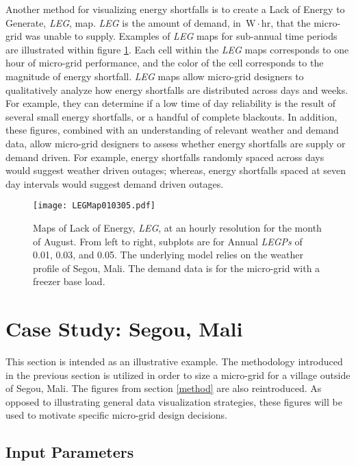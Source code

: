 \documentclass{article}
\newcommand{\unit}[1]{\ensuremath{\, \mathrm{#1}}}
\begin{document}
Another method for visualizing energy shortfalls is to create a Lack of Energy to Generate, \emph{LEG}, map. 
\emph{LEG} is the amount of demand, in \unit{W\! \cdot \! hr}, that the micro-grid was unable to supply.
Examples of \emph{LEG} maps for sub-annual time periods are illustrated within figure \ref{LEGMaps}.
Each cell within the \emph{LEG} maps corresponds to one hour of micro-grid performance, and the color of the cell corresponds to the magnitude of energy shortfall. 
\emph{LEG} maps allow micro-grid designers to qualitatively analyze how energy shortfalls are distributed across days and weeks.
For example, they can determine if a low time of day reliability is the result of several small energy shortfalls, or a handful of complete blackouts. 
In addition, these figures, combined with an understanding of relevant weather and demand data, allow micro-grid designers to assess whether energy shortfalls are supply or demand driven. 
For example, energy shortfalls randomly spaced across days would suggest weather driven outages; whereas, energy shortfalls spaced at seven day intervals would suggest demand driven outages. 


\begin{figure}[ht] 
  \centering
    \texttt{[image: LEGMap010305.pdf]}
  \caption{Maps of Lack of Energy, \emph{LEG}, at an hourly resolution for the month of August.
   From left to right, subplots are for Annual \emph{LEGPs} of 0.01, 0.03, and 0.05. 
  The underlying model relies on the weather profile of Segou, Mali.
  The demand data is for the micro-grid with a freezer base load.}
\label{LEGMaps}
\end{figure}

\section{Case Study: Segou, Mali} \label{CaseStudy}


This section is intended as an illustrative example.
The methodology introduced in the previous section is utilized in order to size a micro-grid for a village outside of Segou, Mali.
The figures from section \ref{method} are also reintroduced.
As opposed to illustrating general data visualization strategies, these figures will be used to motivate specific micro-grid design decisions.


\subsection{Input Parameters}
\end{document}
